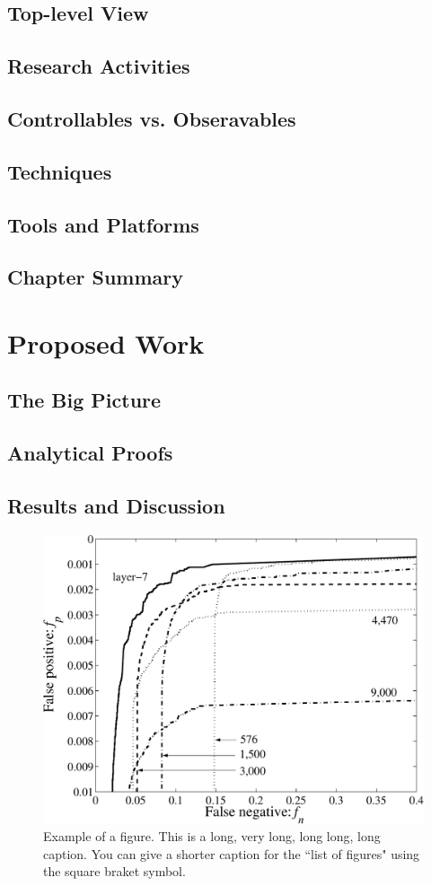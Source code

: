 \documentclass{utmthesis}
\begin{document}
\section{Top-level View}
\section{Research Activities}
\section{Controllables vs. Obseravables}
\section{Techniques}
\section{Tools and Platforms}
\section{Chapter Summary}


\chapter{Proposed Work}
\section{The Big Picture}
\section{Analytical Proofs}


\section{Results and Discussion}

\begin{figure}[p]
	\centering
	\includegraphics[width=\linewidth]{./figs/roc_TREC}
	\caption[Short version of the caption.]{Example of a figure. This is a long, very long, long long, long caption.  You can give a shorter caption for the ``list of figures" using the square braket symbol.}
\end{figure}
\end{document}
